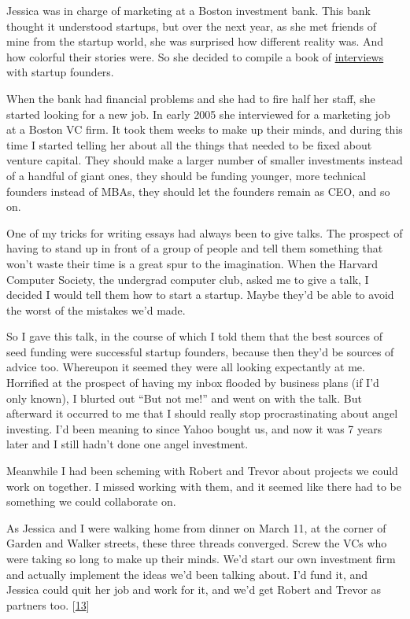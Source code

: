 Jessica was in charge of marketing at a Boston investment bank. This
bank thought it understood startups, but over the next year, as she met
friends of mine from the startup world, she was surprised how different
reality was. And how colorful their stories were. So she decided to
compile a book of
\href{https://www.amazon.com/Founders-Work-Stories-Startups-Early/dp/1430210788}{interviews}
with startup founders.

When the bank had financial problems and she had to fire half her staff,
she started looking for a new job. In early 2005 she interviewed for a
marketing job at a Boston VC firm. It took them weeks to make up their
minds, and during this time I started telling her about all the things
that needed to be fixed about venture capital. They should make a larger
number of smaller investments instead of a handful of giant ones, they
should be funding younger, more technical founders instead of MBAs, they
should let the founders remain as CEO, and so on.

One of my tricks for writing essays had always been to give talks. The
prospect of having to stand up in front of a group of people and tell
them something that won't waste their time is a great spur to the
imagination. When the Harvard Computer Society, the undergrad computer
club, asked me to give a talk, I decided I would tell them how to start
a startup. Maybe they'd be able to avoid the worst of the mistakes we'd
made.

So I gave this talk, in the course of which I told them that the best
sources of seed funding were successful startup founders, because then
they'd be sources of advice too. Whereupon it seemed they were all
looking expectantly at me. Horrified at the prospect of having my inbox
flooded by business plans (if I'd only known), I blurted out ``But not
me!'' and went on with the talk. But afterward it occurred to me that I
should really stop procrastinating about angel investing. I'd been
meaning to since Yahoo bought us, and now it was 7 years later and I
still hadn't done one angel investment.

Meanwhile I had been scheming with Robert and Trevor about projects we
could work on together. I missed working with them, and it seemed like
there had to be something we could collaborate on.

As Jessica and I were walking home from dinner on March 11, at the
corner of Garden and Walker streets, these three threads converged.
Screw the VCs who were taking so long to make up their minds. We'd start
our own investment firm and actually implement the ideas we'd been
talking about. I'd fund it, and Jessica could quit her job and work for
it, and we'd get Robert and Trevor as partners too.
{[}\hyperref[f13n]{13}{]}


